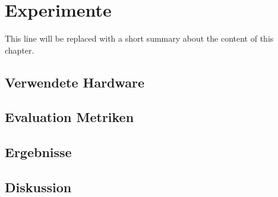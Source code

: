 \chapter{Experimente}

This line will be replaced with a short summary about the content of this chapter.

\section{Verwendete Hardware}

\section{Evaluation Metriken}

\section{Ergebnisse}

\section{Diskussion}
